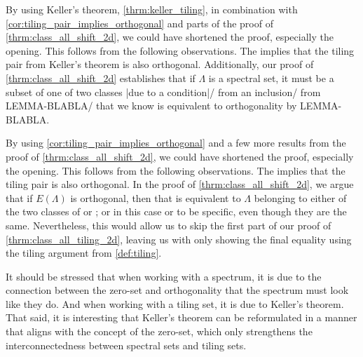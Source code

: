 \documentclass[../thesis.tex]{subfiles}
\begin{document}
\begin{remark}
    By using Keller's theorem, \cref{thrm:keller_tiling}, in combination with \cref{cor:tiling_pair_implies_orthogonal} and parts of the proof of \cref{thrm:class_all_shift_2d}, we could have shortened the proof, especially the opening. This follows from the following observations. The  implies that the tiling pair from Keller's theorem is also orthogonal. Additionally, our proof of \cref{thrm:class_all_shift_2d} establishes that if $\Lambda$ is a spectral set, it must be a subset of one of two classes |due to a condition|/ from an inclusion/ from LEMMA-BLABLA/  that we know is equivalent to orthogonality by LEMMA-BLABLA. 
\end{remark}

\begin{remark}
    By using \cref{cor:tiling_pair_implies_orthogonal} and a few more results from the proof of \cref{thrm:class_all_shift_2d}, we could have shortened the proof, especially the opening. This follows from the following observations. The  implies that the tiling pair is also orthogonal. In the proof of \cref{thrm:class_all_shift_2d}, we argue that if $E(\Lambda)$ is orthogonal, then that is equivalent to $\Lambda$ belonging to either of the two classes of  or ; or in this case  or  to be specific, even though they are the same. Nevertheless, this would allow us to skip the first part of our proof of \cref{thrm:class_all_tiling_2d}, leaving us with only showing the final equality using the tiling argument from \cref{def:tiling}.
\end{remark}

It should be stressed that when working with a spectrum, it is due to the connection between the zero-set and orthogonality that the spectrum must look like they do. And when working with a tiling set, it is due to Keller's theorem. That said, it is interesting that Keller's theorem can be reformulated in a manner that aligns with the concept of the zero-set, which only strengthens the interconnectedness between spectral sets and tiling sets. 
\end{document}
